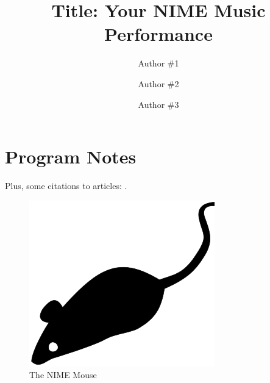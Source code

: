 \documentclass{nimemusic}
\begin{document}
\title{Title: Your NIME Music Performance}



\author{Author \#1}

\author{Author \#2}

\author{Author \#3}


\renewcommand{\shortauthors}{Trovato and Tobin, et al.}




\maketitle


\section{Program Notes}
\lipsum[1] Plus, some citations to articles: \cite{bowman:reasoning,
clark:pct, braams:babel, herlihy:methodology}.

\begin{figure}[hbt]
  \includegraphics{NIME_Mouse}
  \caption{The NIME Mouse}
\end{figure}
\end{document}
